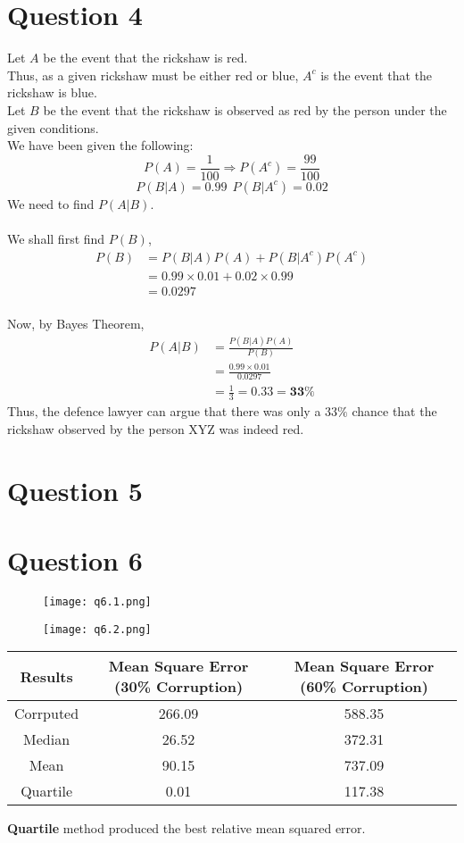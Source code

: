 \documentclass[11pt]{article}
\begin{document}
\newpage
\section{Question 4}
Let $A$ be the event that the rickshaw is red.\\
Thus, as a given rickshaw must be either red or blue, $A^c$ is the event that the rickshaw is blue.\\
Let $B$ be the event that the rickshaw is observed as red by the person under the given conditions.\\
We have been given the following:
$$ 
    P(A) = \frac{1}{100} \Rightarrow P(A^c) = \frac{99}{100}
$$
$$
    P(B|A) = 0.99 \ \  P(B|A^c) = 0.02
$$
We need to find $P(A|B)$. \\
\\
We shall first find $P(B)$,
$$
\begin{aligned}
    P(B) &= P(B|A)P(A) + P(B|A^c)P(A^c)\\
    &= 0.99\times0.01 + 0.02\times0.99\\
    &= 0.0297
\end{aligned}
$$
\\
Now, by Bayes Theorem,
$$
\begin{aligned}
    P(A|B) &= \frac{P(B|A)P(A)}{P(B)}\\
    &= \frac{0.99\times0.01}{0.0297}\\
    &= \frac{1}{3} = 0.33 = \mathbf{33\%}
\end{aligned}
$$
Thus, the defence lawyer can argue that there was only a $33\%$ chance that the rickshaw observed by the person XYZ was indeed red.

\newpage
\section{Question 5}

\newpage
\section{Question 6}
\begin{figure}[H]
    \centering
        \texttt{[image: q6.1.png]}
\end{figure}
\begin{figure}[H]
    \centering
        \texttt{[image: q6.2.png]}
\end{figure}  
\begin{center}
    \begin{tabular}{ |c|c|c| } 
        \hline
        \textbf{Results} & \textbf{Mean Square Error (30\% Corruption)} & \textbf{Mean Square Error (60\% Corruption)}  \\ 
        \hline
        Corrputed & 266.09 & 588.35\\
        \hline
        Median & 26.52 & 372.31\\
        \hline
        Mean & 90.15 & 737.09\\
        \hline
        Quartile & 0.01 & 117.38\\
        \hline
    \end{tabular}
\end{center}
\noindent
\textbf{Quartile} method produced the best relative mean squared error.
\end{document}
